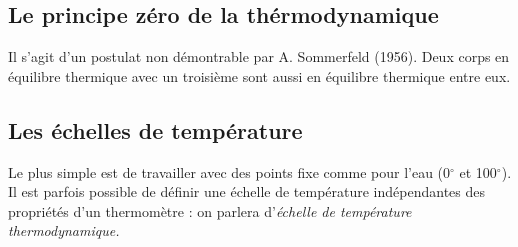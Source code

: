 \subsection{Le principe zéro de la thérmodynamique}
Il s'agit d'un postulat non démontrable par A. Sommerfeld (1956). 
Deux corps en équilibre thermique avec un troisième sont aussi 
en équilibre thermique entre eux.
	
\subsection{Les échelles de température}
Le plus simple est de travailler avec des points fixe comme pour 
l'eau (0$^\circ$ et 100$^\circ$). Il est parfois possible de 
définir une échelle de température indépendantes des propriétés 
d'un thermomètre : on parlera d'\textit{échelle de température 
thermodynamique.}
	
	
	
	
	
	
	
	
	
	
	
	
	
	
	
	
	
	
	
	
	
	
	
	
	
	
	
	
